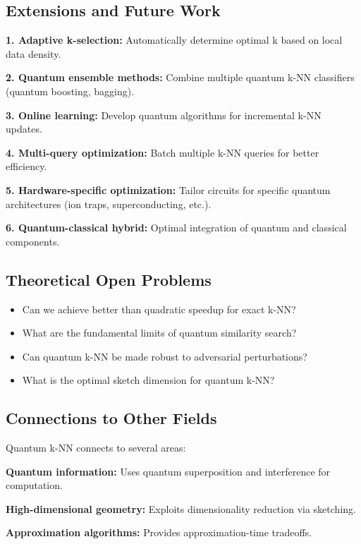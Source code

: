 \documentclass[11pt]{article}
\begin{document}
\subsection{Extensions and Future Work}

\textbf{1. Adaptive k-selection:} Automatically determine optimal k based on local data density.

\textbf{2. Quantum ensemble methods:} Combine multiple quantum k-NN classifiers (quantum boosting, bagging).

\textbf{3. Online learning:} Develop quantum algorithms for incremental k-NN updates.

\textbf{4. Multi-query optimization:} Batch multiple k-NN queries for better efficiency.

\textbf{5. Hardware-specific optimization:} Tailor circuits for specific quantum architectures (ion traps, superconducting, etc.).

\textbf{6. Quantum-classical hybrid:} Optimal integration of quantum and classical components.

\subsection{Theoretical Open Problems}

\begin{itemize}
    \item Can we achieve better than quadratic speedup for exact k-NN?
    \item What are the fundamental limits of quantum similarity search?
    \item Can quantum k-NN be made robust to adversarial perturbations?
    \item What is the optimal sketch dimension for quantum k-NN?
\end{itemize}

\subsection{Connections to Other Fields}

Quantum k-NN connects to several areas:

\textbf{Quantum information:} Uses quantum superposition and interference for computation.

\textbf{High-dimensional geometry:} Exploits dimensionality reduction via sketching.

\textbf{Approximation algorithms:} Provides approximation-time tradeoffs.
\end{document}
